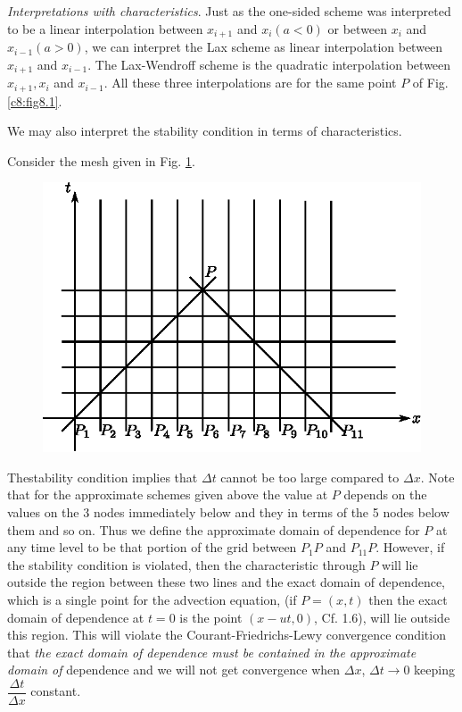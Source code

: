 \begin{remark}\label{chap8:rem8.2}
{\em Interpretations with characteristics}. Just as the one-sided
scheme was interpreted to be a linear interpolation between $x_{i+1}$
and $x_i(a<0)$ or between $x_i$ and $x_{i-1}(a>0)$, we can interpret
the Lax scheme as linear interpolation between $x_{i+1}$ and
$x_{i-1}$. The Lax-Wendroff scheme is the quadratic interpolation
between $x_{i+1}, x_i$ and $x_{i-1}$. All these three interpolations
are for the same point $P$ of Fig. \ref{c8:fig8.1}. 

We may also interpret the stability condition in terms of characteristics.

Consider the mesh given in Fig. \ref{c8:fig8.2}.

\begin{figure}[H]
\centering
\includegraphics{figures/fig52-8.2.eps}
\caption{}\label{c8:fig8.2}
\end{figure}

The\pageoriginale stability condition implies that $\Delta t$ cannot
be too large compared to $\Delta x$.  Note that for the approximate
schemes given above the value at $P$ depends on the values on the 3
nodes immediately below and they in terms of the 5 nodes below them
and so on. Thus we define the approximate domain of dependence for $P$
at any time level to be that portion of the grid between $P_1 P$ and
$P_{11} P $. However, if the stability condition is violated, then the
characteristic through $P$ will lie outside the region between these
two lines and the exact domain of dependence, which is a single point
for the advection equation, (if $P= (x,t)$ then the exact domain of
dependence at $t=0$ is the point $(x- ut, 0)$, Cf. 1.6), will lie
outside this region. This will violate the Courant-Friedrichs-Lewy
convergence condition that {\em the exact domain of dependence must be
  contained in the approximate domain of } dependence and we will not
get convergence when $\Delta x$, $\Delta t \to 0$ keeping
$\dfrac{\Delta t}{\Delta x}$ constant. 
\end{remark}


